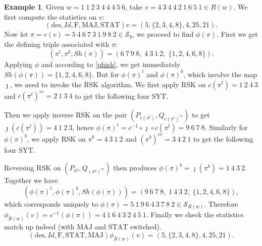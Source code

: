 \documentclass[12pt]{amsart}
\numberwithin{equation}{section}
\theoremstyle{plain}
\theoremstyle{definition}
\newtheorem{example}[theorem]{Example}
\def\MAJ{\mathrm{MAJ}}
\def\STAT{\mathrm{STAT}}
\def\F{\mathrm{F}}
\def\des{\mathrm{des}}
\def\SS{\mathcal{S}}
\begin{document}
\begin{example}
Given $w=1~1~2~3~4~4~4~5~6$, take $v=4~3~4~4~2~1~6~5~1 \in R(w)$. We first compute the statistics on $v$:
$$
(\des, Id, \F, \MAJ, \STAT)v=(5, \{2,3,4,8\}, 4, 25, 21).
$$
Now let $\pi=c(v)=5~4~6~7~3~1~9~8~2\in \SS_9$, we proceed to find $\phi(\pi)$. First we get the defining triple associated with $\pi$:
$$
(\pi^t,\pi^b,Sh(\pi))=(6~7~9~8,\; 4~3~1~2,\; \{1,2,4,6,8\}).
$$
Applying $\phi$ and according to \eqref{phish}, we get immediately $Sh(\phi(\pi))=\{1,2,4,6,8\}$. But for $\phi(\pi)^t$ and $\phi(\pi)^b$, which involve the map $\jmath$, we need to invoke the RSK algorithm. We first apply RSK on $c(\pi^t)=1~2~4~3$ and $c(\pi^t)^{rc}=2~1~3~4$ to get the following four SYT.
\begin{ferrers}
\putright
{}
\putright
{}
\putright
{}
\end{ferrers}
Then we apply inverse RSK on the pair $(P_{c(\pi^t)}, Q_{c(\pi^t)^{rc}})$ to get $\jmath(c(\pi^t))=4~1~2~3$, hence 
$\phi(\pi)^t=c^{-1}\circ \jmath \circ c(\pi^t)=9~6~7~8$. Similarly for $\phi(\pi)^b$, we apply RSK on $\pi^b=4~3~1~2$ and $(\pi^b)^{rc}=3~4~2~1$ to get the following four SYT.
\begin{ferrers}
\putright
{}
\putright
{}
\putright
{}
\end{ferrers}
Reversing RSK on $(P_{\pi^b}, Q_{(\pi^b)^{rc}})$ then produces $\phi(\pi)^b=\jmath(\pi^b)=1~4~3~2$. Together we have
$$
(\phi(\pi)^t,\phi(\pi)^b,Sh(\phi(\pi)))=(9~6~7~8,\; 1~4~3~2,\; \{1,2,4,6,8\}),
$$
which corresponds uniquely to $\phi(\pi)=5~1~9~6~4~3~7~8~2\in \SS_{R(w)}$. Therefore $\phi_{R(w)}(v)=c^{-1}(\phi(\pi))=4~1~6~4~3~2~4~5~1$. Finally we check the statistics match up indeed (with $\MAJ$ and $\STAT$ switched).
$$
(\des, Id, \F, \STAT, \MAJ)\phi_{R(w)}(v)=(5, \{2,3,4,8\}, 4, 25, 21).
$$
\end{example}
\end{document}
